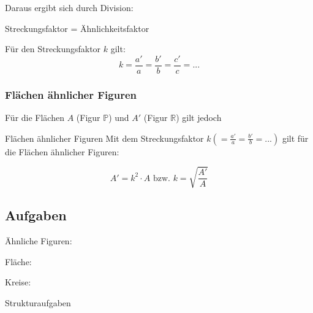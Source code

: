 Daraus ergibt sich durch Division:


\begin{gesetz}{Streckungsfaktor
    = Ähnlichkeitsfaktor}{}

  Für den Streckungsfaktor $k$ gilt:
  $$k = \frac{a'}{a} = \frac{b'}{b} = \frac{c'}{c} = ...$$
\end{gesetz}

\newpage

\subsubsection{Flächen ähnlicher Figuren}
Für die Flächen $A$ (Figur $\mathbb{P}$) und $A'$ (Figur $\mathbb{R}$) gilt jedoch

\begin{gesetz}{Flächen ähnlicher Figuren}{}
  Mit dem Streckungsfaktor $k \left(=\frac{a'}{a} = \frac{b'}{b}= ...\right)$ gilt für die
  Flächen ähnlicher Figuren:
  
  $$A' = k^2 \cdot{} A  \text{ bzw. } k = \sqrt{\frac{A'}{A}}$$
\end{gesetz}


\subsection*{Aufgaben}

Ähnliche Figuren:

Fläche:

Kreise:


Strukturaufgaben



